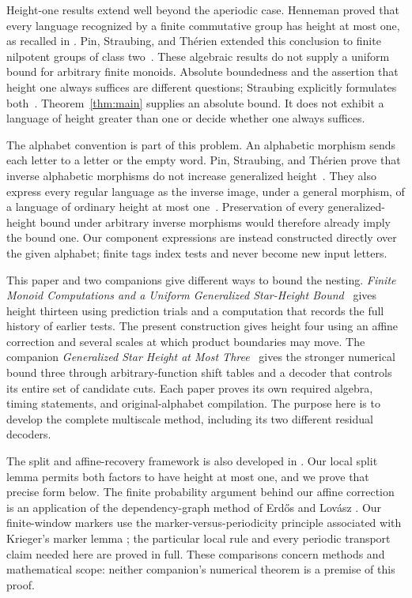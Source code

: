 Height-one results extend well beyond the aperiodic case. Henneman proved
that every language recognized by a finite commutative group has height
at most one, as recalled in \cite[Theorem~3.4]{PST1992}. Pin, Straubing,
and Th\'erien extended this conclusion to finite nilpotent groups of class
two~\cite[Theorem~7.3]{PST1992}. These algebraic results do not supply a
uniform bound for arbitrary finite monoids. Absolute boundedness and the
assertion that height one always suffices are different questions;
Straubing explicitly formulates both~\cite[p.~537]{Straubing2002}.
Theorem~\ref{thm:main} supplies an absolute bound. It does not exhibit a
language of height greater than one or decide whether one always suffices.

The alphabet convention is part of this problem. An alphabetic morphism
sends each letter to a letter or the empty word. Pin, Straubing, and
Th\'erien prove that inverse alphabetic morphisms do not increase generalized
height~\cite[Corollary~4.7]{PST1992}. They also express every regular
language as the inverse image, under a general morphism, of a language
of ordinary height at most one~\cite[Theorem~8.1]{PST1992}. Preservation of every
generalized-height bound under arbitrary inverse morphisms would therefore
already imply the bound one. Our component expressions are instead constructed
directly over the given alphabet; finite tags index tests and never become
new input letters.

This paper and two companions give different ways to bound the nesting.
\emph{Finite Monoid Computations and a Uniform Generalized Star-Height
Bound}~\cite[Theorem~1.1]{Uniform13} gives height thirteen using prediction
trials and a computation that records the full history of earlier tests.
The present construction gives height four using an affine correction and
several scales at which product boundaries may move. The companion
\emph{Generalized Star Height at Most Three}~\cite[Theorem~1.1]{Height3}
gives the stronger numerical bound three through arbitrary-function shift
tables and a decoder that controls its entire set of candidate cuts.
Each paper proves its own required algebra, timing statements, and
original-alphabet compilation. The purpose here is to develop the complete
multiscale method, including its two different residual decoders.

The split and affine-recovery framework is also developed in
\cite[Sections~2--4]{Uniform13}. Our local split lemma permits both factors
to have height at most one, and we prove that precise form below. The
finite probability argument behind our affine correction is an application
of the dependency-graph method of Erd\H{o}s and Lov\'asz
\cite[Section~2]{ErdosLovasz1975}. Our finite-window markers use the
marker-versus-periodicity principle associated with Krieger's marker lemma
\cite[Lemma~2]{Krieger1982}; the particular local rule and every periodic
transport claim needed here are proved in full. These comparisons concern
methods and mathematical scope: neither companion's numerical theorem is
a premise of this proof.

